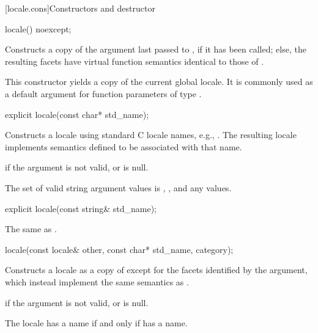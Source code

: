 [locale.cons]{Constructors and destructor}

%
\begin{itemdecl}
locale() noexcept;
\end{itemdecl}

\begin{itemdescr}
\pnum
\effects
Constructs a copy of the argument last passed to
,
if it has been called;
else, the resulting facets have virtual function semantics identical to
those of .
\begin{note}
This constructor yields a copy of the current global locale.
It is commonly used as a default argument for
function parameters of type .
\end{note}
\end{itemdescr}

%
\begin{itemdecl}
explicit locale(const char* std_name);
\end{itemdecl}

\begin{itemdescr}
\pnum
\effects
Constructs a locale using standard C locale names, e.g., .
The resulting locale implements semantics defined to be associated
with that name.

\pnum
\throws
{} if the argument is not valid, or is null.

\pnum
\remarks
The set of valid string argument values is
, , and any  values.
\end{itemdescr}

%
\begin{itemdecl}
explicit locale(const string& std_name);
\end{itemdecl}

\begin{itemdescr}
\pnum
\effects
The same as .
\end{itemdescr}

%
\begin{itemdecl}
locale(const locale& other, const char* std_name, category);
\end{itemdecl}

\begin{itemdescr}
\pnum
\effects
Constructs a locale as a copy of 
except for the facets identified by the  argument,
which instead implement the same semantics as .

\pnum
\throws
{} if the argument is not valid, or is null.

\pnum
\remarks
The locale has a name if and only if  has a name.
\end{itemdescr}

